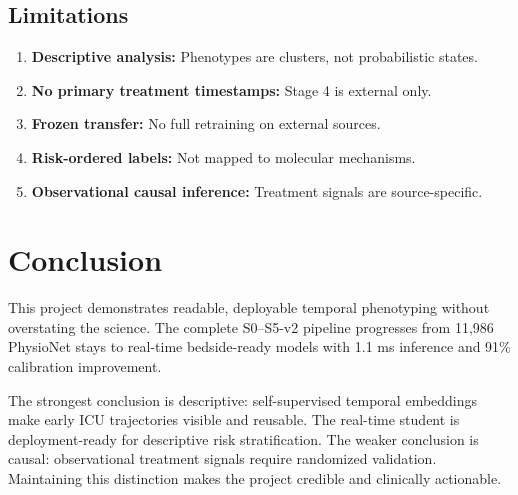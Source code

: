 \documentclass[11pt,a4paper]{article}
\begin{document}
\subsection{Limitations}

\begin{enumerate}[nosep]
  \item \textbf{Descriptive analysis:} Phenotypes are clusters, not probabilistic states.
  \item \textbf{No primary treatment timestamps:} Stage 4 is external only.
  \item \textbf{Frozen transfer:} No full retraining on external sources.
  \item \textbf{Risk-ordered labels:} Not mapped to molecular mechanisms.
  \item \textbf{Observational causal inference:} Treatment signals are source-specific.
\end{enumerate}

\section{Conclusion}

This project demonstrates readable, deployable temporal phenotyping without overstating the science. The complete S0--S5-v2 pipeline progresses from 11,986 PhysioNet stays to real-time bedside-ready models with 1.1 ms inference and 91\% calibration improvement.

The strongest conclusion is descriptive: self-supervised temporal embeddings make early ICU trajectories visible and reusable. The real-time student is deployment-ready for descriptive risk stratification. The weaker conclusion is causal: observational treatment signals require randomized validation. Maintaining this distinction makes the project credible and clinically actionable.
\end{document}

